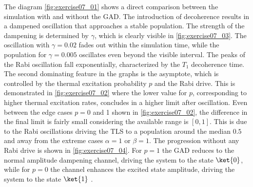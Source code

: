 The diagram \ref{fig:exercise07_01} shows a direct comparison between the simulation with and without the GAD. The introduction of decoherence results in a dampened oscillation that approaches a stable population. The strength of the dampening is determined by $\gamma$, which is clearly visible in \ref{fig:exercise07_03}. The oscillation with $\gamma = 0.02$ fades out within the simulation time, while the population for $\gamma = 0.005$ oscillates even beyond the visible interval. The peaks of the Rabi oscillation fall exponentially, characterized by the $T_1$ decoherence time. The second dominating feature in the graphs is the asymptote, which is controlled by the thermal excitation probability $p$ and the Rabi drive. This is demonstrated in \ref{fig:exercise07_02} where the lower value for $p$, corresponding to higher thermal excitation rates, concludes in a higher limit after oscillation. Even between the edge cases $p = 0$ and 1 shown in \ref{fig:exercise07_02}, the difference in the final limit is fairly small considering the available range is $[0, 1]$. This is due to the Rabi oscillations driving the TLS to a population around the median $0.5$ and away from the extreme cases $\alpha = 1$ or $\beta = 1$. The progression without any Rabi drive is shown in \ref{fig:exercise07_04}. For $p = 1$ the GAD reduces to the normal amplitude dampening channel, driving the system to the state $\ket{0}$, while for $p = 0$ the channel enhances the excited state amplitude, driving the system to the state $\ket{1}$ \cite{Khatri}.
